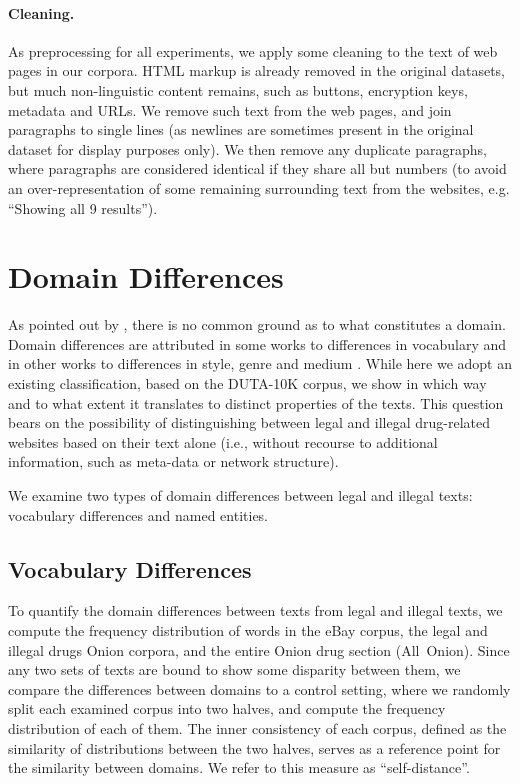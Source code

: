 \documentclass[11pt,a4paper,table]{article}
\begin{document}
\paragraph{Cleaning.} 
As preprocessing for all experiments, we apply some cleaning to the text
of web pages in our corpora.
HTML markup is already removed in the original datasets,
but much non-linguistic content remains, such as
buttons, encryption keys, metadata and URLs.
We remove such text from the web pages, and join paragraphs 
to single lines (as newlines are sometimes present in the original dataset for display purposes only).
We then remove any duplicate paragraphs, where paragraphs are considered
identical if they share all but numbers (to avoid an over-representation of some remaining surrounding text from the websites, e.g. ``Showing all 9 results'').

\section{Domain Differences}\label{sec:domain}

As pointed out by \citet{Plank11}, there is no common ground as to what constitutes a domain. Domain differences are attributed in some works to differences in vocabulary \citep{Blitzer06} and in other works to differences in style, genre and medium \citep{McClosky2010}. While here we adopt an existing classification, based on the DUTA-10K corpus, 
we show in which way and to what extent it translates to distinct properties of the texts. 
This question bears on the possibility of distinguishing between legal and illegal drug-related websites based on their text alone (i.e., without recourse to additional information, such as meta-data or network structure).
    
We examine two types of domain differences between legal and illegal texts: vocabulary differences and named entities. 

\subsection{Vocabulary Differences}

    To quantify the domain differences between texts from legal and illegal texts,
    we compute the frequency distribution of words in the eBay corpus, the legal and illegal drugs Onion corpora, and the entire Onion drug section (All~Onion). 
    Since any two sets of texts are bound to show some disparity between them, we compare the differences between domains to a control setting, where we randomly split each examined corpus into two halves, and compute the frequency distribution of each of them.
    The inner consistency of each corpus, defined as the similarity of distributions between the two halves, serves as a reference point for the similarity between domains.
    We refer to this measure as ``self-distance''.
    
\end{document}
